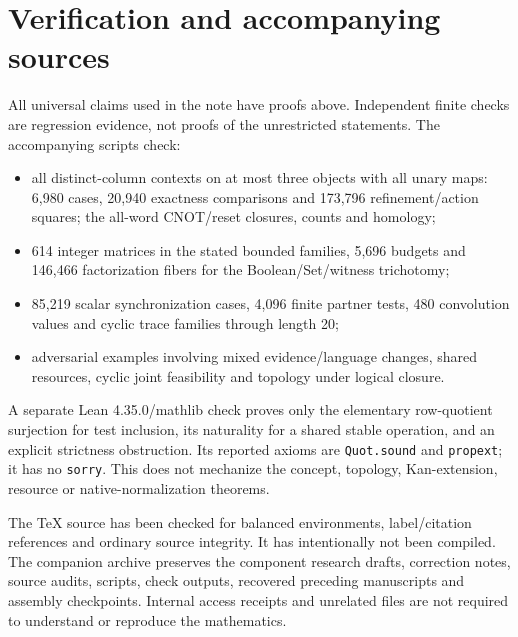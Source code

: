 \documentclass[11pt]{article}
\theoremstyle{definition}\newtheorem{definition}[theorem]{Definition}
\theoremstyle{remark}\newtheorem{remark}[theorem]{Remark}
\begin{document}
\section{Verification and accompanying sources}\label{sec:verification}
All universal claims used in the note have proofs above. Independent finite
checks are regression evidence, not proofs of the unrestricted statements.
The accompanying scripts check:
\begin{itemize}
\item all distinct-column contexts on at most three objects with all unary
maps: 6,980 cases, 20,940 exactness comparisons and 173,796 refinement/action
squares; the all-word CNOT/reset closures, counts and homology;
\item 614 integer matrices in the stated bounded families, 5,696 budgets
and 146,466 factorization fibers for the Boolean/Set/witness trichotomy;
\item 85,219 scalar synchronization cases, 4,096 finite partner tests,
480 convolution values and cyclic trace families through length 20;
\item adversarial examples involving mixed evidence/language changes,
shared resources, cyclic joint feasibility and topology under logical closure.
\end{itemize}
A separate Lean 4.35.0/mathlib check proves only the elementary
row-quotient surjection for test inclusion, its naturality for a shared
stable operation, and an explicit strictness obstruction. Its reported
axioms are \texttt{Quot.sound} and \texttt{propext}; it has no
\texttt{sorry}. This does not mechanize the concept, topology,
Kan-extension, resource or native-normalization theorems.

The TeX source has been checked for balanced environments, label/citation
references and ordinary source integrity. It has intentionally not been
compiled. The companion archive preserves the component research drafts,
correction notes, source audits, scripts, check outputs, recovered preceding
manuscripts and assembly checkpoints. Internal access receipts and unrelated
files are not required to understand or reproduce the mathematics.
\end{document}
